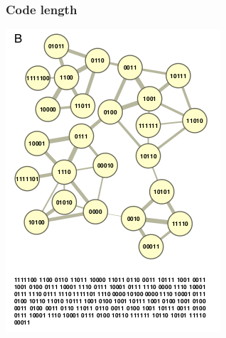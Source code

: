\documentclass{beamer}
\begin{document}
\begin{frame}
  \frametitle{Code length}
  \begin{center}
    \includegraphics[height=0.8\textheight,width=\textwidth,keepaspectratio=true]{figure/map2}

    \tiny{}
  \end{center}
\end{frame}
\end{document}
